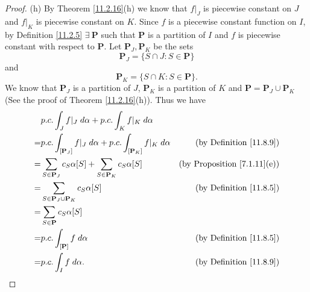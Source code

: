 \begin{proof}{(h)}
    By Theorem \ref{11.2.16}(h) we know that \(f|_J\) is piecewise constant on \(J\) and \(f|_K\) is piecewise constant on \(K\).
    Since \(f\) is a piecewise constant function on \(I\), by Definition \ref{11.2.5} \(\exists\ \mathbf{P}\) such that \(\mathbf{P}\) is a partition of \(I\) and \(f\) is piecewise constant with respect to \(\mathbf{P}\).
    Let \(\mathbf{P}_J, \mathbf{P}_K\) be the sets
    \[
        \mathbf{P}_J = \{S \cap J : S \in \mathbf{P}\}
    \]
    and
    \[
        \mathbf{P}_K = \{S \cap K : S \in \mathbf{P}\}.
    \]
    We know that \(\mathbf{P}_J\) is a partition of \(J\), \(\mathbf{P}_K\) is a partition of \(K\) and \(\mathbf{P} = \mathbf{P}_J \cup \mathbf{P}_K\)
    (See the proof of Theorem \ref{11.2.16}(h)).
    Thus we have
    \begin{align*}
          & p.c. \int_J f|_J \; d \alpha + p.c. \int_K f|_K \; d \alpha                                                                         \\
        = & p.c. \int_{[\mathbf{P}_J]} f|_J \; d \alpha + p.c. \int_{[\mathbf{P}_K]} f|_K \; d \alpha & \text{(by Definition \ref{11.8.9})}     \\
        = & \sum_{S \in \mathbf{P}_J} c_S \alpha[S] + \sum_{S \in \mathbf{P}_K} c_S \alpha[S]         & \text{(by Proposition \ref{7.1.11}(e))} \\
        = & \sum_{S \in \mathbf{P}_J \cup \mathbf{P}_K} c_S \alpha[S]                                 & \text{(by Definition \ref{11.8.5})}     \\
        = & \sum_{S \in \mathbf{P}} c_S \alpha[S]                                                                                               \\
        = & p.c. \int_{[\mathbf{P}]} f \; d \alpha                                                    & \text{(by Definition \ref{11.8.5})}     \\
        = & p.c. \int_I f \; d \alpha.                                                                & \text{(by Definition \ref{11.8.9})}
    \end{align*}
\end{proof}

